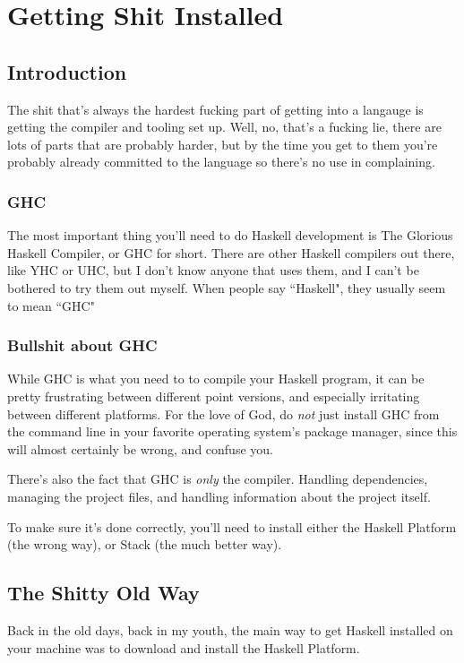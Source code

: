 \chapter{Getting Shit Installed}

\section{Introduction}
The shit that's always the hardest fucking part of getting into a langauge is getting the compiler and tooling set up.  Well, no, that's a fucking lie, there are lots of parts that are probably harder, but by the time you get to them you're probably already committed to the language so there's no use in complaining. 

\subsection{GHC}
The most important thing you'll need to do Haskell development is The Glorious Haskell Compiler, or GHC for short. There are other Haskell compilers out there, like YHC or UHC, but I don't know anyone that uses them, and I can't be bothered to try them out myself. When people say ``Haskell", they usually seem to mean ``GHC"

\subsection{Bullshit about GHC}
While GHC is what you need to to compile your Haskell program, it can be pretty frustrating between different point versions, and especially irritating between different platforms.  For the love of God, do \textit{not} just install GHC from the command line in your favorite operating system's package manager, since this will almost certainly be wrong, and confuse you.  

There's also the fact that GHC is \textit{only} the compiler.  Handling dependencies, managing the project files, and handling information about the project itself. 

To make sure it's done correctly, you'll need to install either the Haskell Platform (the wrong way), or Stack (the much better way). 


\section{The Shitty Old Way}
Back in the old days, back in my youth, the main way to get Haskell installed on your machine was to download and install the Haskell Platform. 

